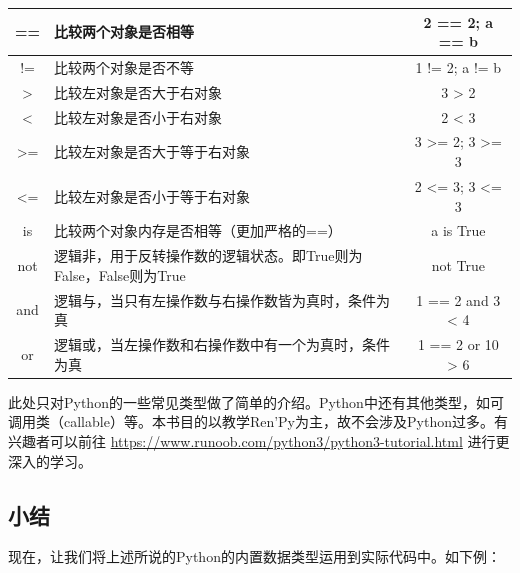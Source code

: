 \documentclass[../../Main.tex]{subfiles}
\begin{document}
\begin{center}
    \tabletail{\hline}
    \tablelasttail{\hline}
    \label{table:4.1.5}
    \begin{supertabular}{|c|p{8cm}|c|}
        \hline
        == & 比较两个对象是否相等 & 2 == 2; a == b\\
        \hline
        != & 比较两个对象是否不等 & 1 != 2; a != b\\
        \hline
        > & 比较左对象是否大于右对象 & 3 > 2\\
        \hline
        < & 比较左对象是否小于右对象 & 2 < 3\\
        \hline
        >= & 比较左对象是否大于等于右对象 & 3 >= 2; 3 >= 3\\
        \hline
        <= & 比较左对象是否小于等于右对象 & 2 <= 3; 3 <= 3\\
        \hline
        is & 比较两个对象内存是否相等（更加严格的==）& a is True\\
        \hline
        not & 逻辑非，用于反转操作数的逻辑状态。即True则为False，False则为True & not True\\
        \hline
        and & 逻辑与，当只有左操作数与右操作数皆为真时，条件为真 & 1 == 2 and 3 < 4\\
        \hline
        or & 逻辑或，当左操作数和右操作数中有一个为真时，条件为真 & 1 == 2 or 10 > 6\\
        \hline
    \end{supertabular}
\end{center}

\begin{ExtraKnowledge}
    此处只对Python的一些常见类型做了简单的介绍。Python中还有其他类型，如可调用类（callable）等。本书目的以教学Ren'Py为主，故不会涉及Python过多。有兴趣者可以前往 \url{https://www.runoob.com/python3/python3-tutorial.html} 进行更深入的学习。
\end{ExtraKnowledge}

\subsection{小结}
现在，让我们将上述所说的Python的内置数据类型运用到实际代码中。如下例：
\end{document}

